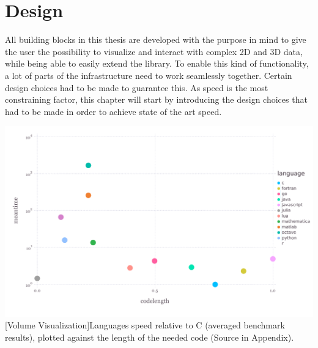 \section{Design}

All building blocks in this thesis are developed with the purpose in mind to give the user the possibility to visualize and interact with complex 2D and 3D data, while being able to easily extend the library.
To enable this kind of functionality, a lot of parts of the infrastructure need to work seamlessly together.
Certain design choices had to be made to guarantee this. As speed is the most constraining factor, this chapter will start by introducing the design choices that had to be made in order to achieve state of the art speed.

\vspace{1em}
\begin{minipage}{\linewidth}
    \centering
    \includegraphics[width=0.9\linewidth]{graphics/julia_bench.pdf}
    [Volume Visualization]{Languages speed relative to C (averaged benchmark results), plotted against the length of the needed code (Source in Appendix).}
    \label{fig:juliabench}
\end{minipage}


